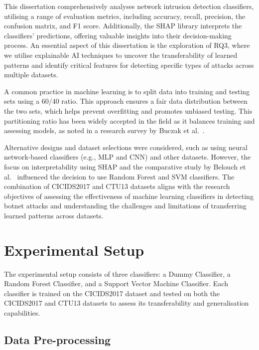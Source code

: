 This dissertation comprehensively analyses network intrusion detection classifiers, utilising a range of evaluation metrics, including accuracy, recall, precision, the confusion matrix, and F1 score. Additionally, the SHAP library interprets the classifiers' predictions, offering valuable insights into their decision-making process. An essential aspect of this dissertation is the exploration of RQ3, where we utilise explainable AI techniques to uncover the transferability of learned patterns and identify critical features for detecting specific types of attacks across multiple datasets.

A common practice in machine learning is to split data into training and testing sets using a 60/40 ratio. This approach ensures a fair data distribution between the two sets, which helps prevent overfitting and promotes unbiased testing. This partitioning ratio has been widely accepted in the field as it balances training and assessing models, as noted in a research survey by Buczak et al.~\cite{buczak2015survey}.

Alternative designs and dataset selections were considered, such as using neural network-based classifiers (e.g., MLP and CNN) and other datasets. However, the focus on interpretability using SHAP and the comparative study by Belouch et al.~\cite{belouch2018performance} influenced the decision to use Random Forest and SVM classifiers. The combination of CICIDS2017 and CTU13 datasets aligns with the research objectives of assessing the effectiveness of machine learning classifiers in detecting botnet attacks and understanding the challenges and limitations of transferring learned patterns across datasets.

\section{Experimental Setup}\label{sec:ExperimentalSetup}

The experimental setup consists of three classifiers: a Dummy Classifier, a Random Forest Classifier, and a Support Vector Machine Classifier. Each classifier is trained on the CICIDS2017 dataset and tested on both the CICIDS2017 and CTU13 datasets to assess its transferability and generalisation capabilities.

\subsection{Data Pre-processing}\label{subsec:DataPreprocessing}

